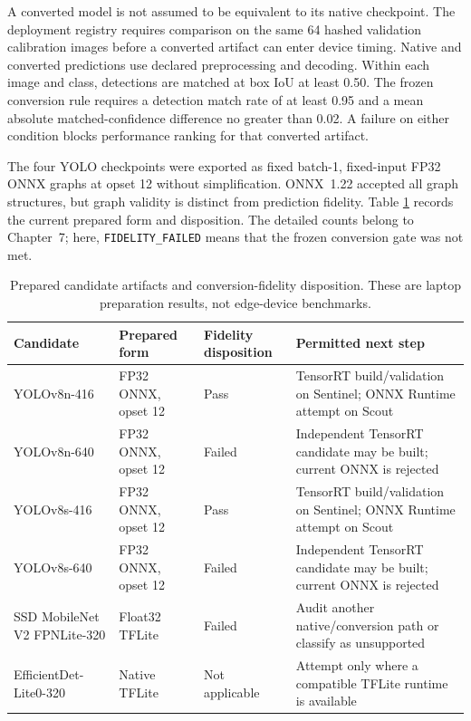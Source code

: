 A converted model is not assumed to be equivalent to its native checkpoint.
The deployment registry requires comparison on the same 64 hashed validation
calibration images before a converted artifact can enter device timing. Native
and converted predictions use declared preprocessing and decoding. Within each
image and class, detections are matched at box IoU at least 0.50. The frozen
conversion rule requires a detection match rate of at least 0.95 and a mean
absolute matched-confidence difference no greater than 0.02. A failure on
either condition blocks performance ranking for that converted artifact.

The four YOLO checkpoints were exported as fixed batch-1, fixed-input FP32 ONNX
graphs at opset 12 without simplification. ONNX~1.22 accepted all graph
structures, but graph validity is distinct from prediction fidelity. Table
\ref{tab:export-fidelity} records the current prepared form and disposition.
The detailed counts belong to Chapter~7; here, \texttt{FIDELITY\_FAILED} means
that the frozen conversion gate was not met.

\begin{table}[H]
  \centering
  \caption{Prepared candidate artifacts and conversion-fidelity disposition.
  These are laptop preparation results, not edge-device benchmarks.}
  \label{tab:export-fidelity}
  \scriptsize
  \begin{tabularx}{\textwidth}{@{}p{}p{}p{}X@{}}
    \toprule
    Candidate & Prepared form & Fidelity disposition & Permitted next step \\
    \midrule
    YOLOv8n-416 & FP32 ONNX, opset 12 & Pass & TensorRT build/validation on Sentinel; ONNX Runtime attempt on Scout \\
    YOLOv8n-640 & FP32 ONNX, opset 12 & Failed & Independent TensorRT candidate may be built; current ONNX is rejected \\
    YOLOv8s-416 & FP32 ONNX, opset 12 & Pass & TensorRT build/validation on Sentinel; ONNX Runtime attempt on Scout \\
    YOLOv8s-640 & FP32 ONNX, opset 12 & Failed & Independent TensorRT candidate may be built; current ONNX is rejected \\
    SSD MobileNet V2 FPNLite-320 & Float32 TFLite & Failed & Audit another native/conversion path or classify as unsupported \\
    EfficientDet-Lite0-320 & Native TFLite & Not applicable & Attempt only where a compatible TFLite runtime is available \\
    \bottomrule
  \end{tabularx}
\end{table}

